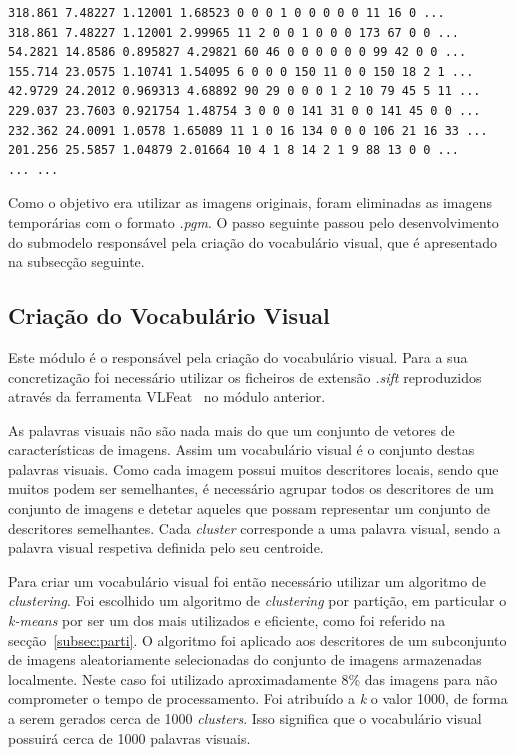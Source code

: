 \begin{lstlisting}
318.861 7.48227 1.12001 1.68523 0 0 0 1 0 0 0 0 0 11 16 0 ...
318.861 7.48227 1.12001 2.99965 11 2 0 0 1 0 0 0 173 67 0 0 ...
54.2821 14.8586 0.895827 4.29821 60 46 0 0 0 0 0 0 99 42 0 0 ...
155.714 23.0575 1.10741 1.54095 6 0 0 0 150 11 0 0 150 18 2 1 ...
42.9729 24.2012 0.969313 4.68892 90 29 0 0 0 1 2 10 79 45 5 11 ...
229.037 23.7603 0.921754 1.48754 3 0 0 0 141 31 0 0 141 45 0 0 ...
232.362 24.0091 1.0578 1.65089 11 1 0 16 134 0 0 0 106 21 16 33 ...
201.256 25.5857 1.04879 2.01664 10 4 1 8 14 2 1 9 88 13 0 0 ...
... ...
\end{lstlisting}

Como o objetivo era utilizar as imagens originais, foram eliminadas as imagens temporárias com o formato \textit{.pgm}. O passo seguinte passou pelo desenvolvimento do submodelo responsável pela criação do vocabulário visual, que é apresentado na subsecção seguinte.

\subsection{Criação do Vocabulário Visual}

Este módulo é o responsável pela criação do vocabulário visual. Para a sua concretização foi necessário utilizar os ficheiros de extensão \textit{.sift} reproduzidos através da ferramenta VLFeat~\cite{vedaldi08vlfeat} no módulo anterior. 

As palavras visuais não são nada mais do que um conjunto de vetores de características de imagens. Assim um vocabulário visual é o conjunto destas palavras visuais. Como cada imagem possui muitos descritores locais, sendo que muitos podem ser semelhantes, é necessário agrupar todos os descritores de um conjunto de imagens e detetar aqueles que possam representar um conjunto de descritores semelhantes. Cada \textit{cluster} corresponde a uma palavra visual, sendo a palavra visual respetiva definida pelo seu
centroide.%

Para criar um vocabulário visual foi então necessário utilizar um algoritmo de \textit{clustering}. Foi escolhido um algoritmo de \textit{clustering} por partição, em particular o \textit{k-means} por ser um dos mais utilizados e eficiente, como foi referido na secção~\ref{subsec:parti}. O algoritmo foi aplicado aos descritores de um subconjunto de imagens aleatoriamente selecionadas do conjunto de imagens armazenadas localmente. Neste caso foi utilizado aproximadamente 8\% das imagens para não comprometer o tempo de processamento. Foi atribuído a \textit{k} o valor 1000, de forma a serem gerados cerca de 1000 \textit{clusters}. Isso significa que o vocabulário visual possuirá cerca de 1000 palavras visuais.

